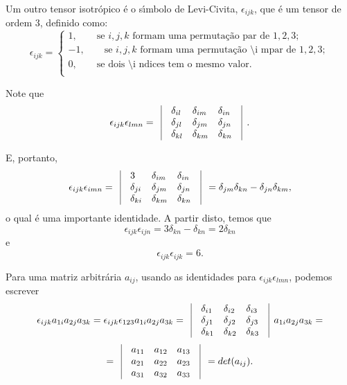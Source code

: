 Um outro tensor isotr\'opico \'e o s\'\i mbolo de Levi-Civita,
$\epsilon_{ijk}$, que \'e um tensor de ordem $3$, definido como:
\[\epsilon_{ijk}=\left\{ \begin{array}{l}
           1,\mbox{   }\mbox{   }\mbox{   }\mbox{se $i,j,k$ formam uma
permuta\c{c}\~ao par de $1,2,3$};\\
          -1,\mbox{   }\mbox{   }\mbox{   }\mbox{se $i,j,k$ formam uma
permuta\c{c}\~ao \'\i mpar de $1,2,3$};\\
           0,\mbox{   }\mbox{   }\mbox{   }\mbox{se dois \'\i ndices tem o mesmo
valor}.\\
\end{array} \right.\]

Note que
\[\epsilon_{ijk}\epsilon_{lmn}= \begin{array}{lllll}
                \vline & \delta_{il} & \delta_{im} & \delta_{in} & \vline\\
                \vline &\delta_{jl} & \delta_{jm} & \delta_{jn} &\vline\\
                 \vline &\delta_{kl} & \delta_{km} & \delta_{kn} &\vline\\
\end{array}.\]

E, portanto,
\[\epsilon_{ijk}\epsilon_{imn}= \begin{array}{lllll}
                \vline & 3 & \delta_{im} & \delta_{in}&\vline \\
                \vline & \delta_{ji} & \delta_{jm} & \delta_{jn}& \vline\\
               \vline & \delta_{ki} & \delta_{km} & \delta_{kn}& \vline\\
\end{array}=\delta_{jm}\delta_{kn}-\delta_{jn}\delta_{km},\]
o qual \'e uma importante identidade. A partir disto, temos que
\[\epsilon_{ijk}\epsilon_{ijn}=3\delta_{kn}-\delta_{kn}=2\delta_{kn}\]
e
\[\epsilon_{ijk}\epsilon_{ijk}=6.\]

Para uma matriz arbitr\'aria $a_{ij}$, usando as identidades  para
$\epsilon_{ijk}\epsilon_{lmn}$, podemos escrever
\[\epsilon_{ijk}a_{1i}a_{2j}a_{3k}=\epsilon_{ijk}\epsilon_{123}a_{1i}a_{2j}a_{3k}=
\begin{array}{lllll}
                \vline&\delta_{i1} & \delta_{i2} & \delta_{i3}&\vline \\
                \vline&\delta_{j1} & \delta_{j2} & \delta_{j3}&\vline \\
                \vline&\delta_{k1} & \delta_{k2} & \delta_{k3}& \vline\\
\end{array}a_{1i}a_{2j}a_{3k}=\] \[ =\begin{array}{lllll}
                \vline&a_{11} & a_{12} & a_{13}& \vline\\
                \vline&a_{21} & a_{22} & a_{23}&\vline \\
                \vline&a_{31} & a_{32} & a_{33}&\vline \\
\end{array}=det(a_{ij}).\]

